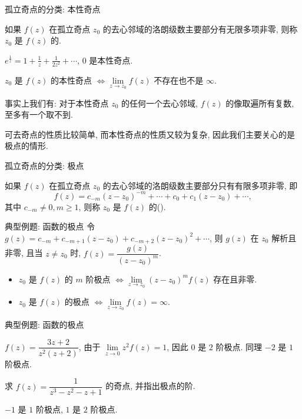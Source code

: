 \begin{frame}{孤立奇点的分类: 本性奇点}
\begin{definition}
如果 $f(z)$ 在孤立奇点 $z_0$ 的去心邻域的洛朗级数主要部分有无限多项非零, 则称 $z_0$ 是 $f(z)$ 的.
\end{definition}
\begin{example}
$\displaystyle e^{\frac1z}=1+\frac1z+\frac1{2z^2}+\cdots$, $0$ 是本性奇点.
\end{example}

\begin{conclusion}
$z_0$ 是 $f(z)$ 的本性奇点 $\iff\lim\limits_{z\to z_0}f(z)$ 不存在也不是 $\infty$.
\end{conclusion}

\onslide<+->
事实上我们有: 对于本性奇点 $z_0$ 的任何一个去心邻域, $f(z)$ 的像取遍所有复数, 至多有一个取不到.

\onslide<+->
可去奇点的性质比较简单, 而本性奇点的性质又较为复杂, 因此我们主要关心的是极点的情形.
\end{frame}


\begin{frame}{孤立奇点的分类: 极点}
\begin{definition}
如果 $f(z)$ 在孤立奇点 $z_0$ 的去心邻域的洛朗级数主要部分只有有限多项非零, 即
\[f(z)=c_{-m}(z-z_0)^{-m}+\cdots+c_0+c_1(z-z_0)+\cdots,\]
其中 $c_{-m}\neq 0,m\ge 1$, 则称 $z_0$ 是 $f(z)$ 的().
\end{definition}
\end{frame}


\begin{frame}{典型例题: 函数的极点}
\onslide<+->
令 $g(z)=c_{-m}+c_{-m+1}(z-z_0)+c_{-m+2}(z-z_0)^2+\cdots$, 则 $g(z)$ 在 $z_0$ 解析且非零,
\onslide<+->
且当 $z\neq z_0$ 时, $f(z)=\dfrac{g(z)}{(z-z_0)^m}$.

\begin{conclusion}
\begin{itemize}
\item $z_0$ 是 $f(z)$ 的 $m$ 阶极点 $\iff\lim\limits_{z\to z_0}(z-z_0)^mf(z)$ 存在且非零.
\item $z_0$ 是 $f(z)$ 的极点 $\iff\lim\limits_{z\to z_0}f(z)=\infty$.
\end{itemize}
\end{conclusion}
\end{frame}


\begin{frame}{典型例题: 函数的极点}
\begin{example}
$f(z)=\dfrac{3z+2}{z^2(z+2)}$,
\onslide<+->
由于 $\lim\limits_{z\to 0}z^2f(z)=1$, 因此 $0$ 是 $2$ 阶极点.
\onslide<+->
同理 $-2$ 是 $1$ 阶极点.
\end{example}

\begin{exercise}
求 $f(z)=\dfrac1{z^3-z^2-z+1}$ 的奇点, 并指出极点的阶.
\end{exercise}
\begin{answer}
$-1$ 是 $1$ 阶极点, $1$ 是 $2$ 阶极点.
\end{answer}
\end{frame}


